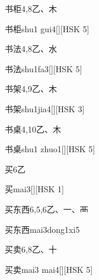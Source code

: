 \begin{entry}{书柜}{4,8}{⼄、⽊}
  \begin{phonetics}{书柜}{shu1 gui4}[][HSK 5]
  \end{phonetics}
\end{entry}

\begin{entry}{书法}{4,8}{⼄、⽔}
  \begin{phonetics}{书法}{shu1fa3}[][HSK 5]
  \end{phonetics}
\end{entry}

\begin{entry}{书架}{4,9}{⼄、⽊}
  \begin{phonetics}{书架}{shu1jia4}[][HSK 3]
  \end{phonetics}
\end{entry}

\begin{entry}{书桌}{4,10}{⼄、⽊}
  \begin{phonetics}{书桌}{shu1 zhuo1}[][HSK 5]
  \end{phonetics}
\end{entry}

\begin{entry}{买}{6}{⼄}
  \begin{phonetics}{买}{mai3}[][HSK 1]
  \end{phonetics}
\end{entry}

\begin{entry}{买东西}{6,5,6}{⼄、⼀、⾑}
  \begin{phonetics}{买东西}{mai3dong1xi5}
  \end{phonetics}
\end{entry}

\begin{entry}{买卖}{6,8}{⼄、⼗}
  \begin{phonetics}{买卖}{mai3 mai4}[][HSK 5]
  \end{phonetics}
\end{entry}


